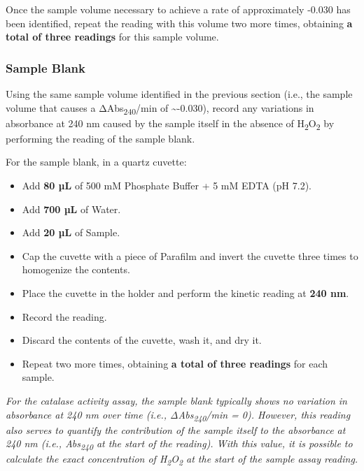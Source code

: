 \documentclass[
  9pt,
  american,
  a5paper,
  extrafontsizes,onecolumn,openright
  ]{memoir}
\providecommand{\tightlist}{%
  \setlength{\itemsep}{0pt}\setlength{\parskip}{0pt}}
\newlength{\rf}
\begin{document}
Once the sample volume necessary to achieve a rate of approximately -0.030 has been identified, repeat the reading with this volume two more times, obtaining \textbf{a total of three readings} for this sample volume.

\subsubsection{Sample Blank}\label{sample_blank}

Using the same sample volume identified in the previous section (i.e., the sample volume that causes a ΔAbs\textsubscript{240}/min of \textasciitilde-0.030), record any variations in absorbance at 240 nm caused by the sample itself in the absence of H\textsubscript{2}O\textsubscript{2} by performing the reading of the sample blank.

For the sample blank, in a quartz cuvette:

\begin{itemize}
\tightlist
\item
  Add \textbf{80 µL} of 500 mM Phosphate Buffer + 5 mM EDTA (pH 7.2).
\item
  Add \textbf{700 µL} of Water.
\item
  Add \textbf{20 µL} of Sample.
\item
  Cap the cuvette with a piece of Parafilm and invert the cuvette three times to homogenize the contents.
\item
  Place the cuvette in the holder and perform the kinetic reading at \textbf{240 nm}.
\item
  Record the reading.
\item
  Discard the contents of the cuvette, wash it, and dry it.
\item
  Repeat two more times, obtaining \textbf{a total of three readings} for each sample.
\end{itemize}

\begin{greybox}[frametitle = Note]
\emph{For the catalase activity assay, the sample blank typically shows no variation in absorbance at 240 nm over time (i.e., ΔAbs\textsubscript{240}/min = 0). However, this reading also serves to quantify the contribution of the sample itself to the absorbance at 240 nm (i.e., Abs\textsubscript{240} at the start of the reading). With this value, it is possible to calculate the exact concentration of H\textsubscript{2}O\textsubscript{2} at the start of the sample assay reading.}

\end{greybox}
\end{document}
